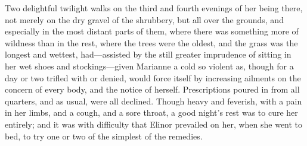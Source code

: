 Two delightful twilight walks on the third and fourth evenings of her being there, not merely on the dry gravel of the shrubbery, but all over the grounds, and especially in the most distant parts of them, where there was something more of wildness than in the rest, where the trees were the oldest, and the grass was the longest and wettest, had—assisted by the still greater imprudence of sitting in her wet shoes and stockings—given Marianne a cold so violent as, though for a day or two trifled with or denied, would force itself by increasing ailments on the concern of every body, and the notice of herself. Prescriptions poured in from all quarters, and as usual, were all declined. Though heavy and feverish, with a pain in her limbs, and a cough, and a sore throat, a good night's rest was to cure her entirely; and it was with difficulty that Elinor prevailed on her, when she went to bed, to try one or two of the simplest of the remedies.